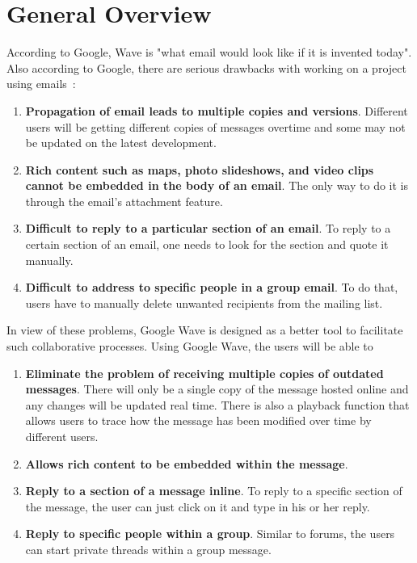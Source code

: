 
\usepackage{helvet} \renewcommand{\familydefault}{\sfdefault} 
\usepackage[footnotesize]{caption}
\usepackage{wrapfig}

\setcounter{milestone}{-1}



\medskip


\section{General Overview}

According to Google, Wave is "what email would look like if it is
invented today". Also according to Google, there are serious drawbacks
with working on a project using emails~\cite{googlewave}:

\begin{enumerate}
\item \textbf{Propagation of email leads to multiple copies and versions}.  
Different users will be getting different copies of messages overtime
and some may not be updated on the latest development.
\item \textbf{Rich content such as maps, photo slideshows, and video clips
cannot be embedded in the body of an email}. The only way to do it is
through the email's attachment feature.
\item \textbf{Difficult to reply to a particular section of an email}. 
To reply to a certain section of an email, one needs to look for the
section and quote it manually.
\item \textbf{Difficult to address to specific people in a group email}.
To do that, users have to manually delete unwanted recipients from the
mailing list.
\end{enumerate}

In view of these problems, Google Wave is designed as a better tool to
facilitate such collaborative processes. Using Google Wave, the users
will be able to
\begin{enumerate}
\item \textbf{Eliminate the problem of receiving multiple copies 
of outdated messages}. There will only be a single copy of the message hosted online and any changes will be updated real time. There is also
a playback function that allows users to trace how the message has
been modified over time by different users.
\item \textbf{Allows rich content to be embedded within the message}.
\item \textbf{Reply to a section of a message inline}. To reply to a 
specific section of the message, the user can just click on it and
type in his or her reply.
\item \textbf{Reply to specific people within a group}. Similar to 
forums, the users can start private threads within a group message.
\end{enumerate}

